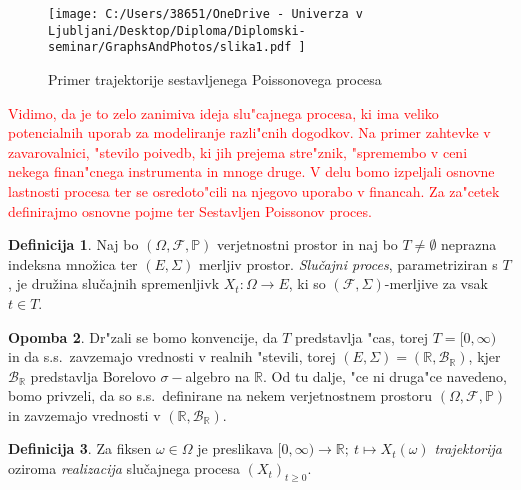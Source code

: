 \documentclass[12pt,a4paper]{amsart}
\theoremstyle{definition} %
\newtheorem{definicija}{Definicija}[section]
\newtheorem{opomba}[definicija]{Opomba}
\theoremstyle{plain} %
\newcommand{\R}{\mathbb{R}}
\newcommand{\B}{\mathcal{B}}
\newcommand{\1}{\mathds{1}}
\begin{document}
    \begin{figure}[H]
        \centering
        \texttt{[image: 
            C:/Users/38651/OneDrive - Univerza v Ljubljani/Desktop/Diploma/Diplomski-seminar/GraphsAndPhotos/slika1.pdf
            ]}
        \caption{Primer trajektorije sestavljenega Poissonovega procesa}
        \label{fig:slika1}
    \end{figure}
    
    \noindent
\textcolor{red}{
    Vidimo, da je to zelo zanimiva ideja slu"cajnega
    procesa, ki ima veliko potencialnih uporab za modeliranje razli"cnih dogodkov. Na primer zahtevke 
    v zavarovalnici, "stevilo poivedb, ki jih prejema stre"znik, "spremembo v ceni nekega finan"cnega 
    instrumenta in mnoge druge. V delu bomo izpeljali osnovne lastnosti procesa ter se osredoto"cili 
    na njegovo uporabo v financah. Za za"cetek definirajmo osnovne pojme ter Sestavljen Poissonov proces.
}

    \begin{definicija}
        Naj bo $(\Omega, \mathcal{F}, \mathbb{P})$ verjetnostni prostor in naj bo $T\neq\emptyset$
        neprazna indeksna množica ter $(E, \Sigma)$ merljiv prostor. \textit{Slučajni proces}, 
        parametriziran s $T$, je družina slučajnih spremenljivk $X_t : \Omega \to E$,
         ki so $(\mathcal{F}, \Sigma)$-merljive za vsak $t \in T$.
        \label{def:slucProc}
    \end{definicija}

    \begin{opomba}
        Dr"zali se bomo konvencije, da $T$ predstavlja "cas, torej $T = [0, \infty)$ in da s.s.\
        zavzemajo vrednosti v realnih "stevili, torej $(E, \Sigma) = (\R, \B_{\R})$, kjer $\B_\R$ 
        predstavlja Borelovo $\sigma-$algebro na $\R$. Od tu dalje, "ce ni druga"ce navedeno, bomo 
        privzeli, da so s.s.\ definirane na nekem verjetnostnem prostoru 
        $(\Omega, \mathcal{F}, \mathbb{P})$ in zavzemajo vrednosti v $(\R, \B_{\R})$.
        \label{op:Konvencije}
    \end{opomba}


    \begin{definicija}
        Za fiksen $\omega \in \Omega$ je preslikava 
        $[0, \infty) \rightarrow \mathbb{R}; \ t \mapsto X_t(\omega)$ 
        \textit{trajektorija} oziroma \textit{realizacija} slučajnega procesa $(X_t)_{t\geq0}$.
        \label{def:realizac}
    \end{definicija}
\end{document}

